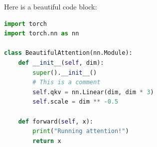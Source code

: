 \documentclass{article}
\begin{document}
Here is a beautiful code block:

\begin{mdframed}[backgroundcolor=codebg, linecolor=codeframe, linewidth=1pt, roundcorner=4pt, innerleftmargin=2pt, innerrightmargin=5pt, innertopmargin=5pt, innerbottommargin=5pt]
\begin{lstlisting}[language=Python]
import torch
import torch.nn as nn

class BeautifulAttention(nn.Module):
    def __init__(self, dim):
        super().__init__()
        # This is a comment
        self.qkv = nn.Linear(dim, dim * 3)
        self.scale = dim ** -0.5
        
    def forward(self, x):
        print("Running attention!")
        return x
\end{lstlisting}
\end{mdframed}
\end{document}
